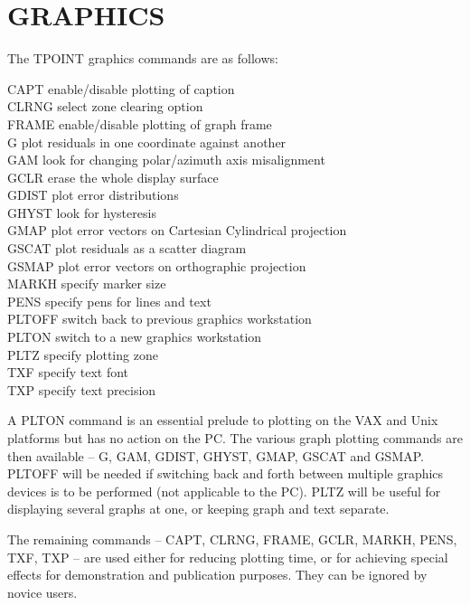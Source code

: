 \section{GRAPHICS}
The TPOINT graphics commands 
are as follows:
\begin{cmnds}
\> \> CAPT   \> enable/disable plotting of caption \\
\> \> CLRNG  \> select zone clearing option \\
\> \> FRAME  \> enable/disable plotting of graph frame \\
\> \> G      \> plot residuals in one coordinate against another \\
\> \> GAM    \> look for changing polar/azimuth axis misalignment \\
\> \> GCLR   \> erase the whole display surface \\
\> \> GDIST  \> plot error distributions \\
\> \> GHYST  \> look for hysteresis \\
\> \> GMAP   \> plot error vectors on Cartesian Cylindrical projection \\
\> \> GSCAT  \> plot residuals as a scatter diagram \\
\> \> GSMAP  \> plot error vectors on orthographic projection \\
\> \> MARKH  \> specify marker size \\
\> \> PENS   \> specify pens for lines and text \\
\> \> PLTOFF \> switch back to previous graphics workstation \\
\> \> PLTON  \> switch to a new graphics workstation \\
\> \> PLTZ   \> specify plotting zone \\
\> \> TXF    \> specify text font \\
\> \> TXP    \> specify text precision
\end{cmnds}

A PLTON command is an essential prelude to plotting on the VAX
and Unix platforms but has no action on the PC.
The various graph plotting commands are
then available -- G, GAM, GDIST, GHYST, GMAP, GSCAT and GSMAP.
PLTOFF will be needed if switching back and forth between
multiple graphics devices is to be performed (not applicable to the PC).
PLTZ will be useful for displaying several
graphs at one, or keeping graph and text separate.

The remaining commands -- CAPT, CLRNG, FRAME, GCLR, MARKH,
PENS, TXF, TXP -- are used either for reducing plotting
time, or for achieving special effects for demonstration
and publication purposes.  They can be ignored by novice users.

